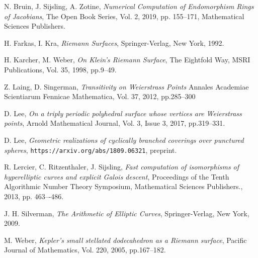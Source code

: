 \documentclass[12pt,reqno]{amsart}
\theoremstyle{definition}
\theoremstyle{remark}
\begin{document}
\begin{thebibliography}{20}


N. Bruin, J. Sijsling, A. Zotine,
\textit{Numerical Computation of Endomorphism Rings of Jacobians},
The Open Book Series,
Vol. 2, 2019, pp. 155--171, Mathematical Sciences Publishers.

H. Farkas, I. Kra,
\textit{Riemann Surfaces},
Springer-Verlag, New York, 1992.

H. Karcher, M. Weber,
\textit{On Klein's Riemann Surface},
The Eightfold Way, MSRI Publications, 
Vol. 35, 1998, pp.9--49.

Z. Laing, D. Singerman,
\textit{Transitivity on Weierstrass Points}
Annales Academiae Scientiarum Fennicae Mathematica,
Vol. 37, 2012, pp.285--300

D. Lee,
\textit{On a triply periodic polyhedral surface whose vertices are Weierstrass points},
Arnold Mathematical Journal, 
Vol. 3, Issue 3, 2017, pp.319--331.

D. Lee, 
\textit{Geometric realizations of cyclically branched coverings over punctured spheres},
\texttt{https://arxiv.org/abs/1809.06321}, preprint.

R. Lercier, C. Ritzenthaler, J. Sijsling,
\textit{Fast computation of isomorphisms of hyperelliptic curves and explicit Galois descent},
Proceedings of the Tenth Algorithmic Number Theory Symposium, Mathematical Sciences Publishers.,
2013, pp. 463–-486.

J. H. Silverman,
\textit{The Arithmetic of Elliptic Curves},
Springer-Verlag, New York, 2009.

M. Weber,
\textit{Kepler's small stellated dodecahedron as a Riemann surface},
Pacific Journal of Mathematics, 
Vol. 220, 2005, pp.167--182.


\end{thebibliography}
\end{document}
